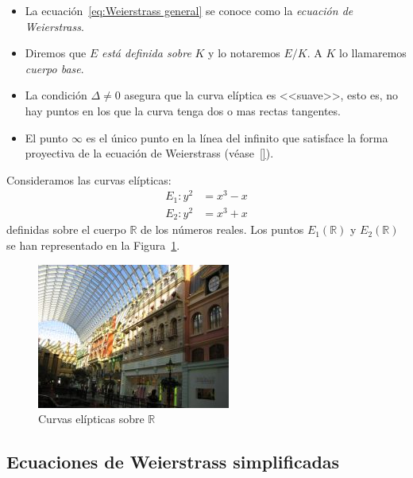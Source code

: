 \begin{nota}\leavevmode
	\begin{itemize}
		\item La ecuación~\eqref{eq:Weierstrass general} se conoce como la \emph{ecuación de Weierstrass}.
		\item Diremos que $E$ \emph{está definida sobre} $K$ y lo notaremos $E/K$. A $K$ lo llamaremos \emph{cuerpo base}.
		\item La condición $\Delta \neq 0$ asegura que la curva elíptica es <<suave>>, esto es, no hay puntos en los que la curva tenga dos o mas rectas tangentes.
		\item El punto $\infty$ es el único punto en la línea del infinito que satisface la forma proyectiva de la ecuación de Weierstrass (véase~\ref{}).
	\end{itemize}
\end{nota}

\begin{ejemplo}
	Consideramos las curvas elípticas:
	\begin{align*}
		E_1: y^2 & = x^3 - x \\
		E_2: y^2 & = x^3 + x
	\end{align*}
	definidas sobre el cuerpo $\mathbb{R}$ de los números reales. Los puntos $E_1(\mathbb{R})$ y $E_2(\mathbb{R})$ se han representado en la Figura~\ref{fig:curvas elípticas reales}.

	\begin{figure}[h]
		\centering
		\includegraphics[scale=1]{gfx/example_1}
		\caption{Curvas elípticas sobre $\mathbb{R}$}\label{fig:curvas elípticas reales}
	\end{figure}
\end{ejemplo}

\subsection{Ecuaciones de Weierstrass simplificadas}
\label{sub:Ecuaciones de Weierstrass simplificadas}

